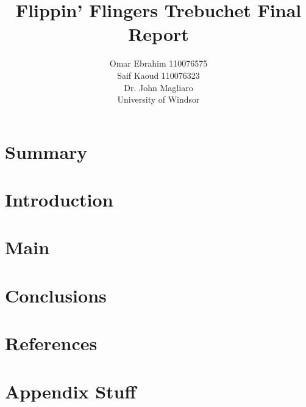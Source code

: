\documentclass[12pt, titlepage]{article}
\title{Flippin' Flingers Trebuchet Final Report}
\author{Omar Ebrahim 110076575\\Saif Kaoud 110076323\\[10pt] Dr. John Magliaro\\
University of Windsor}
\begin{document}
    \maketitle
    \section{Summary}
    \newpage
    \tableofcontents \newpage
    \listoffigures \newpage
    \listoftables \newpage
    \section{Introduction}
    \newpage
    \section{Main}
    \newpage
    \section{Conclusions}
    \newpage
    \section{References}
    \newpage

    \appendix
    \section{Appendix Stuff}
\end{document}

